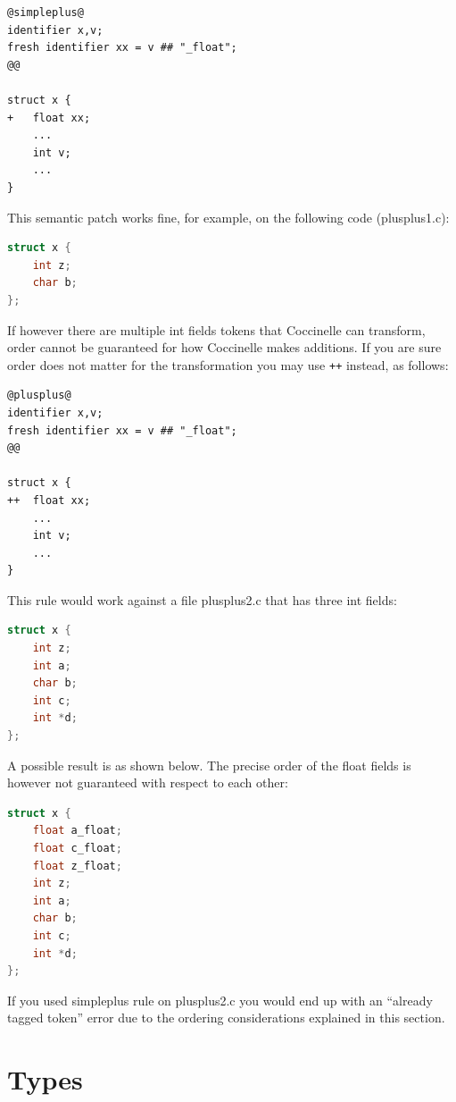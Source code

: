 \begin{lstlisting}[language=Cocci]
@simpleplus@
identifier x,v;
fresh identifier xx = v ## "_float";
@@

struct x {
+	float xx;
	...
	int v;
	...
}
\end{lstlisting}

This semantic patch works fine, for example, on the following code
(plusplus1.c):

\begin{lstlisting}[language=C]
struct x {
	int z;
	char b;
};
\end{lstlisting}

If however there are multiple int fields tokens that Coccinelle
can transform, order cannot be guaranteed for how Coccinelle
makes additions. If you are sure order does not matter for
the transformation you may use \texttt{++} instead, as follows:

\begin{lstlisting}[language=Cocci]
@plusplus@
identifier x,v;
fresh identifier xx = v ## "_float";
@@

struct x {
++	float xx;
	...
	int v;
	...
}
\end{lstlisting}

This rule would work against a file plusplus2.c that has three
int fields:

\begin{lstlisting}[language=C]
struct x {
	int z;
	int a;
	char b;
	int c;
	int *d;
};
\end{lstlisting}

A possible result is as shown below. The precise order of the float fields
is however not guaranteed with respect to each other:

\begin{lstlisting}[language=C]
struct x {
	float a_float;
	float c_float;
	float z_float;
	int z;
	int a;
	char b;
	int c;
	int *d;
};
\end{lstlisting}

If you used simpleplus rule on plusplus2.c you would end up with
an ``already tagged token'' error due to the ordering considerations
explained in this section.

\section{Types}
\label{types}

